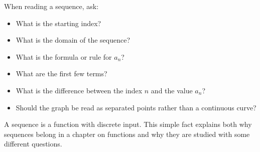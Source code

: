 \begin{summarybox}
When reading a sequence, ask:
\begin{itemize}
\item What is the starting index?
\item What is the domain of the sequence?
\item What is the formula or rule for \(a_n\)?
\item What are the first few terms?
\item What is the difference between the index \(n\) and the value \(a_n\)?
\item Should the graph be read as separated points rather than a continuous curve?
\end{itemize}
\end{summarybox}

A sequence is a function with discrete input. This simple fact explains both why sequences belong in a chapter on functions and why they are studied with some different questions.